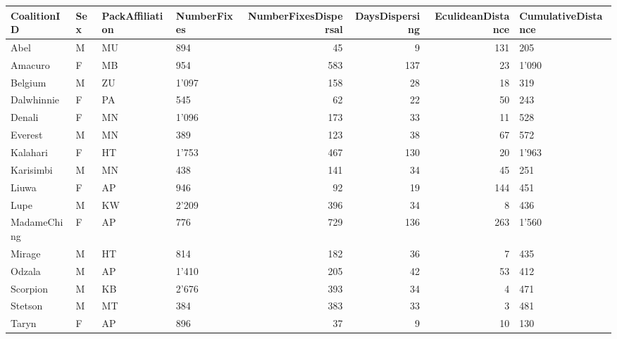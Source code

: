 \begin{tabular}{llllrrrl}
  \toprule
CoalitionID & Sex & PackAffiliation & NumberFixes & NumberFixesDispersal & DaysDispersing & EculideanDistance & CumulativeDistance \\ 
  \midrule
Abel & M & MU & 894 & 45 & 9 & 131 & 205 \\ 
  Amacuro & F & MB & 954 & 583 & 137 & 23 & 1'090 \\ 
  Belgium & M & ZU & 1'097 & 158 & 28 & 18 & 319 \\ 
  Dalwhinnie & F & PA & 545 & 62 & 22 & 50 & 243 \\ 
  Denali & F & MN & 1'096 & 173 & 33 & 11 & 528 \\ 
  Everest & M & MN & 389 & 123 & 38 & 67 & 572 \\ 
  Kalahari & F & HT & 1'753 & 467 & 130 & 20 & 1'963 \\ 
  Karisimbi & M & MN & 438 & 141 & 34 & 45 & 251 \\ 
  Liuwa & F & AP & 946 & 92 & 19 & 144 & 451 \\ 
  Lupe & M & KW & 2'209 & 396 & 34 & 8 & 436 \\ 
  MadameChing & F & AP & 776 & 729 & 136 & 263 & 1'560 \\ 
  Mirage & M & HT & 814 & 182 & 36 & 7 & 435 \\ 
  Odzala & M & AP & 1'410 & 205 & 42 & 53 & 412 \\ 
  Scorpion & M & KB & 2'676 & 393 & 34 & 4 & 471 \\ 
  Stetson & M & MT & 384 & 383 & 33 & 3 & 481 \\ 
  Taryn & F & AP & 896 & 37 & 9 & 10 & 130 \\ 
   \bottomrule
\end{tabular}
